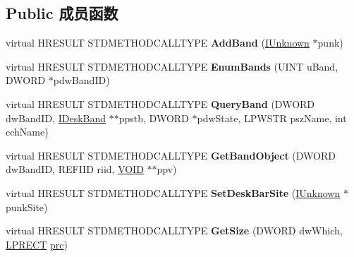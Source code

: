 \subsection*{Public 成员函数}
\begin{DoxyCompactItemize}
\item 
\mbox{\label{class_c_menu_site_afded1bf84516b530c2b133d1468f4988}} 
virtual H\+R\+E\+S\+U\+LT S\+T\+D\+M\+E\+T\+H\+O\+D\+C\+A\+L\+L\+T\+Y\+PE {\bfseries Add\+Band} (\hyperlink{interface_i_unknown}{I\+Unknown} $\ast$punk)
\item 
\mbox{\label{class_c_menu_site_afdba9cb41bdd6424616794d5fe6a460f}} 
virtual H\+R\+E\+S\+U\+LT S\+T\+D\+M\+E\+T\+H\+O\+D\+C\+A\+L\+L\+T\+Y\+PE {\bfseries Enum\+Bands} (U\+I\+NT u\+Band, D\+W\+O\+RD $\ast$pdw\+Band\+ID)
\item 
\mbox{\label{class_c_menu_site_a00ec9f98cbfcce8786c0e09df4eddab8}} 
virtual H\+R\+E\+S\+U\+LT S\+T\+D\+M\+E\+T\+H\+O\+D\+C\+A\+L\+L\+T\+Y\+PE {\bfseries Query\+Band} (D\+W\+O\+RD dw\+Band\+ID, \hyperlink{interface_i_desk_band}{I\+Desk\+Band} $\ast$$\ast$ppstb, D\+W\+O\+RD $\ast$pdw\+State, L\+P\+W\+S\+TR psz\+Name, int cch\+Name)
\item 
\mbox{\label{class_c_menu_site_a3293c10248d51bab928ff30f70af4bca}} 
virtual H\+R\+E\+S\+U\+LT S\+T\+D\+M\+E\+T\+H\+O\+D\+C\+A\+L\+L\+T\+Y\+PE {\bfseries Get\+Band\+Object} (D\+W\+O\+RD dw\+Band\+ID, R\+E\+F\+I\+ID riid, \hyperlink{interfacevoid}{V\+O\+ID} $\ast$$\ast$ppv)
\item 
\mbox{\label{class_c_menu_site_a7183269da5d0fcf166152050112bd8f9}} 
virtual H\+R\+E\+S\+U\+LT S\+T\+D\+M\+E\+T\+H\+O\+D\+C\+A\+L\+L\+T\+Y\+PE {\bfseries Set\+Desk\+Bar\+Site} (\hyperlink{interface_i_unknown}{I\+Unknown} $\ast$punk\+Site)
\item 
\mbox{\label{class_c_menu_site_a8ce38beb125f5cb1cb8800d0829c29f8}} 
virtual H\+R\+E\+S\+U\+LT S\+T\+D\+M\+E\+T\+H\+O\+D\+C\+A\+L\+L\+T\+Y\+PE {\bfseries Get\+Size} (D\+W\+O\+RD dw\+Which, \hyperlink{structtag_r_e_c_t}{L\+P\+R\+E\+CT} \hyperlink{structtag_r_e_c_t}{prc})
\item 
\mbox{\label{class_c_menu_site_a5298f86bef0e59880fa3a96666b723fb}} 

\end{DoxyCompactItemize}
